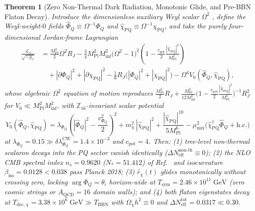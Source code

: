 \documentclass[11pt,a4paper]{article}
\newtheorem{theorem}{Theorem}[section]
\begin{document}
\begin{theorem}[Zero Non-Thermal Dark Radiation, Monotonic Glide, and Pre-BBN Flaton Decay]
\label{thm:starobinsky}
Introduce the dimensionless auxiliary Weyl scalar $\Omega^2$ \cite{Whitt1984,Olcsak2026Paper24}, define the Weyl-weight-$0$ fields $\hat{\Phi}_Q \equiv \Omega^{-1}\Phi_Q$ and $\hat{\chi}_{\mathrm{PQ}} \equiv \Omega^{-1}\chi_{\mathrm{PQ}}$, and take the purely four-dimensional Jordan-frame Lagrangian
\begin{equation}
\begin{aligned}
\frac{\mathcal{L}_J}{\sqrt{-g_J}} &= \frac{M_{\mathrm{Pl}}^2}{2}\Omega^2 R_J - \frac{3}{4}M_{\mathrm{Pl}}^2 M_{\mathrm{inf}}^2\big(\Omega^2 - 1\big)^2\!\left(1 - \frac{c_{\mathrm{pot}}}{2}\frac{|\hat{\chi}_{\mathrm{PQ}}|^2}{M_{\mathrm{Pl}}^2}\right) \\
&\quad + |\partial\Phi_Q|^2 + |\partial\chi_{\mathrm{PQ}}|^2 - \frac{1}{6}R_J\big(|\Phi_Q|^2 + |\chi_{\mathrm{PQ}}|^2\big) - \Omega^4 V_0(\hat{\Phi}_Q, \hat{\chi}_{\mathrm{PQ}}),
\end{aligned}
\label{eq:jordan-action}
\end{equation}
whose algebraic $\Omega^2$ equation of motion reproduces $\frac{M_{\mathrm{Pl}}^2}{2}R_J + \frac{M_{\mathrm{Pl}}^2}{12 M_{\mathrm{inf}}^2}\big(1 - \frac{c_{\mathrm{pot}}}{2}\frac{|\hat{\chi}_{\mathrm{PQ}}|^2}{M_{\mathrm{Pl}}^2}\big)^{-1}R_J^2$ for $V_0 \ll M_{\mathrm{Pl}}^2 M_{\mathrm{inf}}^2$, with $\mathbb{Z}_{16}$-invariant scalar potential
\begin{equation}
V_0(\hat{\Phi}_Q, \hat{\chi}_{\mathrm{PQ}}) = \lambda_{\Phi_Q}\!\left(|\hat{\Phi}_Q|^2 - \frac{v_{\Phi_Q}^2}{2}\right)^2 + m_\chi^2\,|\hat{\chi}_{\mathrm{PQ}}|^2 + \frac{|\hat{\chi}_{\mathrm{PQ}}|^{10}}{5 M_{\mathrm{Pl}}^6} - \mu_{\mathrm{mix}}^2\big(\hat{\chi}_{\mathrm{PQ}}^\dagger \hat{\Phi}_Q + \mathrm{h.c.}\big)
\label{eq:V0-potential}
\end{equation}
at $\lambda_{\Phi_Q} = 0.15 \gg \delta\lambda_{\Phi_Q}^{\mathrm{CW}} = 1.4\times 10^{-3}$ and $c_{\mathrm{pot}} = 4$. Then: (1) tree-level non-thermal scalaron decays into the PQ sector vanish identically ($\Delta N_{\mathrm{eff}}^{\text{non-th}} \equiv 0$); (2) the NLO CMB spectral index $n_s = 0.9620$ ($N_* = 51.412$) of Ref.~\cite{Olcsak2026Paper24} and isocurvature $\beta_{\mathrm{iso}} = 0.0128 < 0.038$ pass Planck 2018; (3) $\hat{r}_\chi(t)$ glides monotonically without crossing zero, locking $\arg\Phi_Q = \theta_i$ horizon-wide at $T_{\mathrm{sym}} = 2.46\times 10^{11}\;\mathrm{GeV}$ (zero cosmic strings or $A_{\mathrm{QCD}}=16$ domain walls); and (4) both flaton eigenstates decay at $T_{\mathrm{dec},\chi} = 3.38\times 10^6\;\mathrm{GeV} \gg T_{\mathrm{BBN}}$ with $\Omega_\chi h^2 \equiv 0$ and $\Delta N_{\mathrm{eff}}^{\mathrm{tot}} = 0.0317 \ll 0.30$.
\end{theorem}
\end{document}
